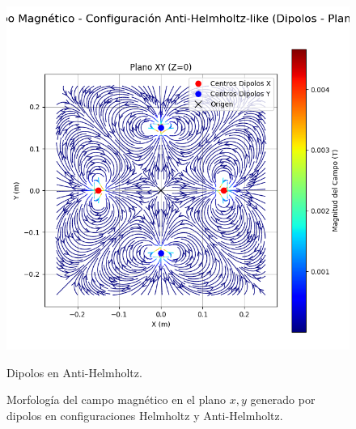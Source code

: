 \begin{figure}[H]
\begin{minipage}[b]{0.48\textwidth}
        \includegraphics[width=\linewidth, trim={0cm 2cm 0cm 1cm}, clip]{Sections/Figures/antihelmholtz_dipoles_xy_field.png} %
        \caption{Dipolos en Anti-Helmholtz.}
        \label{fig:antihelmholtz_dipoles_xy_field}
    \end{minipage}
    \caption{Morfología del campo magnético en el plano $x,y$ generado por dipolos en configuraciones Helmholtz y Anti-Helmholtz.}
    \label{fig:campos_dipolos}
\end{figure}

